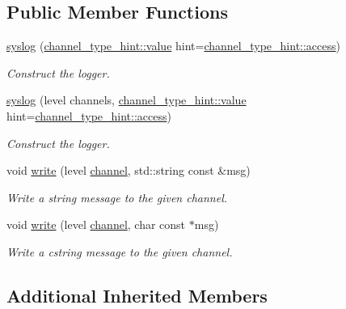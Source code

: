 \subsection*{Public Member Functions}
\begin{DoxyCompactItemize}
\item 
\mbox{\hyperlink{classwebsocketpp_1_1log_1_1syslog_ab43c642587ea5628c25407341b0e5b11}{syslog}} (\mbox{\hyperlink{structwebsocketpp_1_1log_1_1channel__type__hint_ad12a7f6555b71aabdc4cbec604dc89dd}{channel\+\_\+type\+\_\+hint\+::value}} hint=\mbox{\hyperlink{structwebsocketpp_1_1log_1_1channel__type__hint_a8c38587fffbffbfcfc35577734b0d653}{channel\+\_\+type\+\_\+hint\+::access}})
\begin{DoxyCompactList}\small\item\em Construct the logger. \end{DoxyCompactList}\item 
\mbox{\hyperlink{classwebsocketpp_1_1log_1_1syslog_a28c4016aa44ca9d6415c36c2bc85bf30}{syslog}} (level channels, \mbox{\hyperlink{structwebsocketpp_1_1log_1_1channel__type__hint_ad12a7f6555b71aabdc4cbec604dc89dd}{channel\+\_\+type\+\_\+hint\+::value}} hint=\mbox{\hyperlink{structwebsocketpp_1_1log_1_1channel__type__hint_a8c38587fffbffbfcfc35577734b0d653}{channel\+\_\+type\+\_\+hint\+::access}})
\begin{DoxyCompactList}\small\item\em Construct the logger. \end{DoxyCompactList}\item 
void \mbox{\hyperlink{classwebsocketpp_1_1log_1_1syslog_a48c3f60a621c9ffd9cebbe0959a29ca6}{write}} (level \mbox{\hyperlink{classchannel}{channel}}, std\+::string const \&msg)
\begin{DoxyCompactList}\small\item\em Write a string message to the given channel. \end{DoxyCompactList}\item 
void \mbox{\hyperlink{classwebsocketpp_1_1log_1_1syslog_a2fda2d9b4aa71d4b47b7e93359b5b0d9}{write}} (level \mbox{\hyperlink{classchannel}{channel}}, char const $\ast$msg)
\begin{DoxyCompactList}\small\item\em Write a cstring message to the given channel. \end{DoxyCompactList}\end{DoxyCompactItemize}
\subsection*{Additional Inherited Members}


